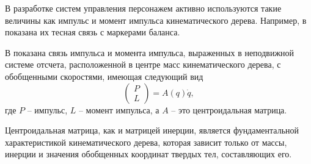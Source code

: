 В разработке систем управления персонажем активно используются такие величины как импульс и момент импульса кинематического дерева. Например, в \cite{MacchiettoZS} показана их тесная связь с маркерами баланса.

В \cite{OrinG} показана связь импульса и момента импульса, выраженных в неподвижной системе отсчета, расположенной в центре масс кинематического дерева, с обобщенными скоростями, имеющая следующий вид
\[
\begin{pmatrix} P\\ L \end{pmatrix} = A(q) \dot{q},
\]
где $P$ -- импульс, $L$ -- момент импульса, а $A$ -- это центроидальная матрица.

Центроидальная матрица, как и матрицей инерции, является фундаментальной характеристикой кинематического дерева, которая зависит только от массы, инерции и значения обобщенных координат твердых тел, составляющих его.
